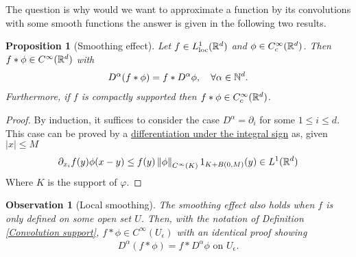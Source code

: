 \documentclass[12pt]{article}
\newtheorem{observation}{Observation}
\newtheorem{proposition}{Proposition}
\theoremstyle{remark}
\renewcommand{\norm}[1]{\left\lVert #1 \right\rVert}\renewcommand{\abs}[1]{\left| #1 \right|}
\begin{document}
The question is why would we want to approximate a function by its convolutions with some smooth functions the answer is given in the following two results.
\begin{proposition}[Smoothing effect]\label{smooth}
	Let $f \in L^1_{\text{loc}}(\mathbb{R}^d)$ and $\phi \in C_c^\infty(\mathbb{R}^d)$. Then $f*\phi \in C^\infty(\mathbb{R}^d)$ with
	\begin{align*}
		D^\alpha(f *\phi)=f*D^\alpha \phi , \quad\forall \alpha \in \mathbb{N}^d.
	\end{align*}
	Furthermore, if $f$ is compactly supported then  $f*\phi \in  C_c^\infty(\mathbb{R}^d)$.
\end{proposition}
\begin{proof}
	By induction, it suffices to consider the case $D^\alpha = \partial _i$ for some $1 \leq i \leq d$. This case can be proved by a \href{https://nowheredifferentiable.com/2023-01-29-PDE-1-Fourier/#:~:text=Proposition%202%20}{differentiation under the integral sign} as, given $\abs{x}\leq M$
	\begin{align*}
		\partial _{x_i} f(y)\phi(x-y) \leq f(y)\norm{\phi}_{C^\infty(K)} 1_{K+B(0,M)}(y) \in L^1(\R^d)
	\end{align*}
	Where $K$ is the support of  $\varphi$.
\end{proof}
\begin{observation}[Local smoothing]\label{local smoothing}
	The smoothing effect also holds when $f$ is only defined on some open set $U$. Then, with the notation of Definition \ref{Convolution support}, $f*\phi \in C^\infty(U_\epsilon )    $ with an identical proof showing
	\begin{align*}
		D^\alpha(f *\phi)=f*D^\alpha \phi \text{ on } U_\epsilon .
	\end{align*}
\end{observation}
\end{document}
